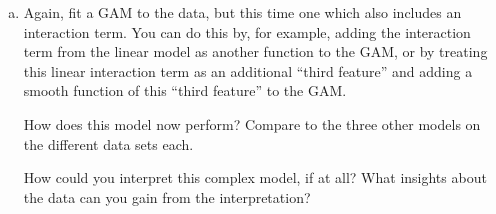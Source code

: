 {\begin{enumerate}[a)]
    What can you conclude about the different data sets?
    In particular, given your observations from all three models, do you consider any of the three data sets to be modeled very well by any of the models so far?

    \item
    Again, fit a GAM to the data, but this time one which also includes an interaction term.
    You can do this by, for example, adding the interaction term from the linear model as another function to the GAM, or by treating this linear interaction term as an additional ``third feature'' and adding a smooth function of this ``third feature'' to the GAM.

    How does this model now perform?
    Compare to the three other models on the different data sets each.
    
    How could you interpret this complex model, if at all? What insights about the data can you gain from the interpretation?
\end{enumerate}

}